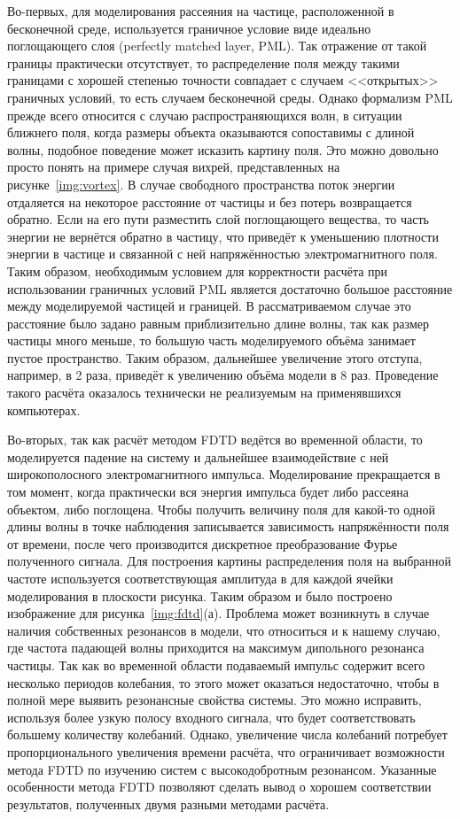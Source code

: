 Во-первых, для моделирования рассеяния на частице, расположенной в
бесконечной среде, используется граничное условие виде идеально
поглощающего слоя (perfectly matched layer, PML). Так отражение от
такой границы практически отсутствует, то распределение поля между
такими границами с хорошей степенью точности совпадает с случаем
<<открытых>> граничных условий, то есть случаем бесконечной среды.
Однако формализм PML прежде всего относится с случаю
распространяющихся волн, в ситуации ближнего поля, когда размеры
объекта оказываются сопоставимы с длиной волны, подобное поведение
может исказить картину поля. Это можно довольно просто понять на
примере случая вихрей, представленных на рисунке~\ref{img:vortex}.  В
случае свободного пространства поток энергии отдаляется на некоторое
расстояние от частицы и без потерь возвращается обратно. Если на его
пути разместить слой поглощающего вещества, то часть энергии не
вернётся обратно в частицу, что приведёт к уменьшению плотности
энергии в частице и связанной с ней напряжённостью электромагнитного
поля.  Таким образом, необходимым условием для корректности расчёта
при использовании граничных условий PML является достаточно большое
расстояние между моделируемой частицей и границей. В рассматриваемом
случае это расстояние было задано равным приблизительно длине волны,
так как размер частицы много меньше, то большую часть моделируемого
объёма занимает пустое пространство. Таким образом, дальнейшее
увеличение этого отступа, например, в 2 раза, приведёт к увеличению
объёма модели в 8 раз. Проведение такого расчёта оказалось технически
не реализуемым на применявшихся компьютерах.

Во-вторых, так как расчёт методом FDTD ведётся во временной области,
то моделируется падение на систему и дальнейшее взаимодействие с ней
широкополосного электромагнитного импульса.  Моделирование
прекращается в том момент, когда практически вся энергия импульса
будет либо рассеяна объектом, либо поглощена.  Чтобы получить величину
поля для какой-то одной длины волны в точке наблюдения записывается
зависимость напряжённости поля от времени, после чего производится
дискретное преобразование Фурье полученного сигнала. Для построения
картины распределения поля на выбранной частоте используется
соответствующая амплитуда в для каждой ячейки моделирования в
плоскости рисунка. Таким образом и было построено изображение для
рисунка~\ref{img:fdtd}(а). Проблема может возникнуть в случае наличия
собственных резонансов в модели, что относиться и к нашему случаю, где
частота падающей волны приходится на максимум дипольного резонанса
частицы. Так как во временной области подаваемый импульс содержит
всего несколько периодов колебания, то этого может оказаться
недостаточно, чтобы в полной мере выявить резонансные свойства
системы.  Это можно исправить, используя более узкую полосу входного
сигнала, что будет соответствовать большему количеству колебаний.
Однако, увеличение числа колебаний потребует пропорционального
увеличения времени расчёта, что ограничивает возможности метода FDTD
по изучению систем с высокодобротным резонансом. Указанные особенности
метода FDTD позволяют сделать вывод о хорошем соответствии
результатов, полученных двумя разными методами расчёта.


